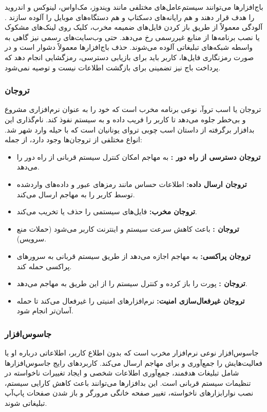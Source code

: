 باج‌افزارها می‌توانند سیستم‌عامل‌های مختلفی مانند ویندوز، مک‌اواس، لینوکس و اندروید را هدف قرار دهند و هم رایانه‌های دسکتاپ و هم دستگاه‌های موبایل را آلوده سازند \cite{AndroidSecurity}. آلودگی معمولاً از طریق باز کردن فایل‌های ضمیمه مخرب، کلیک روی لینک‌های مشکوک یا نصب برنامه‌ها از منابع غیررسمی رخ می‌دهد. حتی وب‌سایت‌های رسمی نیز گاهی به واسطه شبکه‌های تبلیغاتی آلوده می‌شوند. حذف باج‌افزارها معمولاً دشوار است و در صورت رمزنگاری فایل‌ها، کاربر باید برای بازیابی دسترسی، رمزگشایی انجام دهد که پرداخت باج نیز تضمینی برای بازگشت اطلاعات نیست و توصیه نمی‌شود.

\subsubsection{تروجان}
تروجان یا اسب تروآ، نوعی برنامه مخرب است که خود را به عنوان نرم‌افزاری مشروع و بی‌خطر جلوه می‌دهد تا کاربر را فریب داده و به سیستم نفوذ کند. نام‌گذاری این بدافزار برگرفته از داستان اسب چوبی تروای یونانیان است که با حیله وارد شهر شد. انواع مختلفی از تروجان‌ها وجود دارد، از جمله:
\begin{itemize}
    \item \textbf{تروجان دسترسی از راه دور :} به مهاجم امکان کنترل سیستم قربانی از راه دور را می‌دهد.
    \item \textbf{تروجان ارسال داده:} اطلاعات حساس مانند رمزهای عبور و داده‌های واردشده توسط کاربر را به مهاجم ارسال می‌کند.
    \item \textbf{تروجان مخرب:} فایل‌های سیستمی را حذف یا تخریب می‌کند.
    \item \textbf{تروجان :} باعث کاهش سرعت سیستم و اینترنت کاربر می‌شود (حملات منع سرویس).
    \item \textbf{تروجان پراکسی:} به مهاجم اجازه می‌دهد از طریق سیستم قربانی به سرورهای پراکسی حمله کند.
    \item \textbf{تروجان :} پورت  را باز کرده و کنترل سیستم را از این طریق به مهاجم می‌دهد.
    \item \textbf{تروجان غیرفعال‌سازی امنیت:} نرم‌افزارهای امنیتی را غیرفعال می‌کند تا حمله آسان‌تر انجام شود.
\end{itemize}

\subsubsection{جاسوس‌افزار}
جاسوس‌افزار نوعی نرم‌افزار مخرب است که بدون اطلاع کاربر، اطلاعاتی درباره او یا فعالیت‌هایش را جمع‌آوری و برای مهاجم ارسال می‌کند. کاربردهای رایج جاسوس‌افزارها شامل تبلیغات هدفمند، جمع‌آوری اطلاعات شخصی و ایجاد تغییرات ناخواسته در تنظیمات سیستم قربانی است. این بدافزارها می‌توانند باعث کاهش کارایی سیستم، نصب نوارابزارهای ناخواسته، تغییر صفحه خانگی مرورگر و باز شدن صفحات پاپ‌آپ تبلیغاتی شوند.

